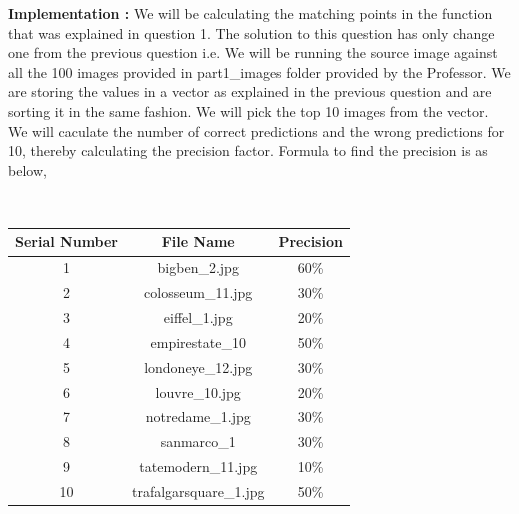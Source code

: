 \documentclass{article}
\begin{document}
\begin{enumerate}
			\textbf{Implementation :} We will be calculating the matching points in the function that was explained in question 1. The solution to this question has only change one from the previous question i.e. We will be running the source image against all the 100 images provided in part1\_images folder provided by the Professor. We are storing the values in a vector as explained in the previous question and are sorting it in the same fashion. We will pick the top 10 images from the vector. We will caculate the number of correct predictions and the wrong predictions for 10, thereby calculating the precision factor. Formula to find the precision is as below,
				\begin{center}
					
			
			
			 \\
					\end{center}
					
					
					
						\begin{center}
							\begin{tabular}{||c c c ||} 
								\hline
								Serial Number & File Name & Precision \\ [0.5ex] 
								\hline\hline
								1 & bigben\_2.jpg& 60\% \\ 
								\hline
								2 & colosseum\_11.jpg & 30\% \\
								\hline
								3 & eiffel\_1.jpg	& 20\%  \\
								\hline
								4 & empirestate\_10 & 50\%  \\
								\hline
								5 & londoneye\_12.jpg &   30\%\\ 
								\hline
								6 & louvre\_10.jpg	 & 20\%  \\
								\hline
								7 & notredame\_1.jpg & 30\%  \\
								\hline
								8 & sanmarco\_1 &30\%  \\
								\hline
								9 & tatemodern\_11.jpg & 10\%  \\
								\hline
								10 & trafalgarsquare\_1.jpg & 50\% \\
								\hline
							\end{tabular}
						\end{center}
						

\end{enumerate}
\end{document}

